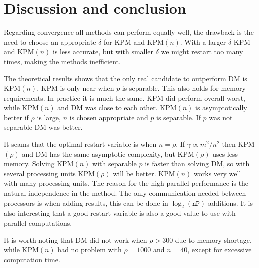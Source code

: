 \chapter{Discussion and conclusion}%
Regarding convergence all methods can perform equally well, the drawback is the need to choose an appropriate $\delta$ for KPM and KPM$(n)$. With a larger $\delta$ KPM and KPM$(n)$ is less accurate, but with smaller $\delta$ we might restart too many times, making the methods inefficient. 


The theoretical results shows that the only real candidate to outperform DM is KPM$(n)$, KPM is only near when $p$ is separable. This also holds for memory requirements. In practice it is much the same. KPM did perform overall worst, while KPM$(n)$ and DM was close to each other. KPM$(n)$ is asymptotically better if $\rho$ is large, $n$ is chosen appropriate and $p$ is separable. If $p$ was not separable DM was better.

It seams that the optimal restart variable is when $n = \rho$. If $\gamma \propto m^2/n^2$ then KPM$(\rho)$ and DM has the same asymptotic complexity, but KPM$(\rho)$ uses less memory. Solving KPM$(n)$ with separable $p$ is faster than solving DM, so with several processing units KPM$(\rho)$ will be better. KPM$(n)$ works very well with many processing units. The reason for the high parallel performance is the natural independence in the method. The only communication needed between processors is when adding results, this can be done in $\log_2(\texttt{nP})$ additions. It is also interesting that a good restart variable is also a good value to use with parallel computations.




It is worth noting that DM did not work when $\rho>300$ due to memory shortage, while KPM$(n)$ had no problem with $\rho = 1000$ and $n = 40$, except for excessive computation time. \\




